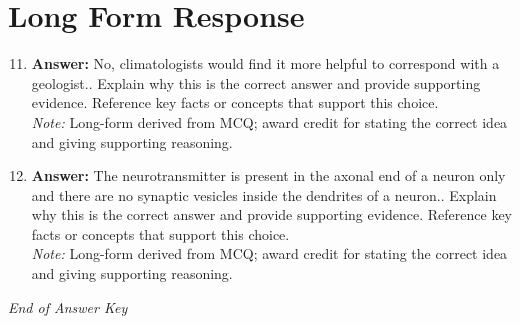 \documentclass[12pt]{article}
\begin{document}
\section*{Long Form Response}
\begin{enumerate}[label=\arabic*.]
\setcounter{enumi}{10}
\item \textbf{Answer:} No, climatologists would find it more helpful to correspond with a geologist.. Explain why this is the correct answer and provide supporting evidence. Reference key facts or concepts that support this choice.
\\ \textit{Note:} Long-form derived from MCQ; award credit for stating the correct idea and giving supporting reasoning.
\item \textbf{Answer:} The neurotransmitter is present in the axonal end of a neuron only and there are no synaptic vesicles inside the dendrites of a neuron.. Explain why this is the correct answer and provide supporting evidence. Reference key facts or concepts that support this choice.
\\ \textit{Note:} Long-form derived from MCQ; award credit for stating the correct idea and giving supporting reasoning.
\end{enumerate}

\vfill
\noindent\textit{End of Answer Key}
\end{document}
